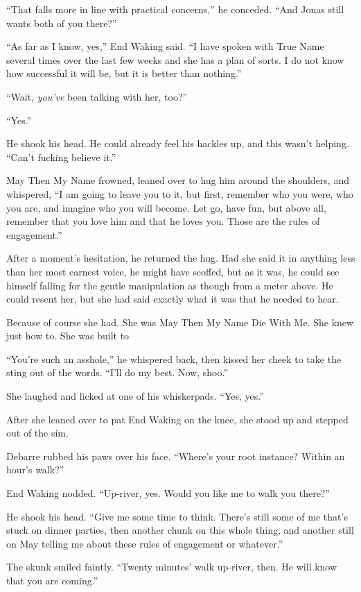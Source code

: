 ``That falls more in line with practical concerns,'' he conceded. ``And Jonas still wants both of you there?''

``As far as I know, yes,'' End Waking said. ``I have spoken with True Name several times over the last few weeks and she has a plan of sorts. I do not know how successful it will be, but it is better than nothing.''

``Wait, \emph{you've} been talking with her, too?''

``Yes.''

He shook his head. He could already feel his hackles up, and this wasn't helping. ``Can't fucking believe it.''

May Then My Name frowned, leaned over to hug him around the shoulders, and whispered, ``I am going to leave you to it, but first, remember who you were, who you are, and imagine who you will become. Let go, have fun, but above all, remember that you love him and that he loves you. Those are the rules of engagement.''

After a moment's hesitation, he returned the hug. Had she said it in anything less than her most earnest voice, he might have scoffed, but as it was, he could see himself falling for the gentle manipulation as though from a meter above. He could resent her, but she had said exactly what it was that he needed to hear.

Because of course she had. She was May Then My Name Die With Me. She knew just how to. She was built to

``You're such an asshole,'' he whispered back, then kissed her cheek to take the sting out of the words. ``I'll do my best. Now, shoo.''

She laughed and licked at one of his whiskerpads. ``Yes, yes.''

After she leaned over to pat End Waking on the knee, she stood up and stepped out of the sim.

Debarre rubbed his paws over his face. ``Where's your root instance? Within an hour's walk?''

End Waking nodded. ``Up-river, yes. Would you like me to walk you there?''

He shook his head. ``Give me some time to think. There's still some of me that's stuck on dinner parties, then another chunk on this whole thing, and another still on May telling me about these rules of engagement or whatever.''

The skunk smiled faintly. ``Twenty minutes' walk up-river, then. He will know that you are coming.''

